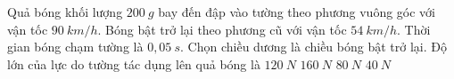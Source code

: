 \begin{vidu}%
Quả bóng khối lượng $200\ g$ bay đến đập vào tường theo phương vuông góc với vận tốc $90\ km/h$. Bóng bật trở lại theo phương cũ với vận tốc $54\ km/h$. Thời gian bóng chạm tường là $0,05\ s$. Chọn chiều dương là chiều bóng bật trở lại. Độ lớn của lực do tường tác dụng lên quả bóng là
\choice
{$120\ N$}
{\True $160\ N$}
{$80\ N$}
{$40\ N$}
 \end{vidu}


